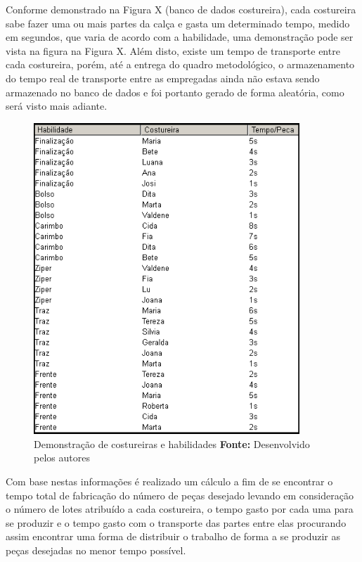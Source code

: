 \par Conforme demonstrado na Figura X (banco de dados costureira), cada costureira sabe fazer uma ou mais partes da calça e gasta um determinado tempo, medido em segundos, que varia de acordo com a habilidade, uma demonstração pode ser vista na figura na Figura X. Além disto, existe um tempo de transporte entre cada costureira, porém, até a entrega do quadro metodológico, o armazenamento do tempo
real de transporte entre as empregadas ainda não estava sendo armazenado no banco de dados e foi portanto gerado de forma aleatória, 
como será visto mais adiante.

\newpage

\begin{figure}[h!]
	\centerline{\includegraphics[width=10cm]{./imagens/tempo_habilidade2.png}}
	\caption[Costureiras e Habilidades]
	{Demonstração de costureiras e habilidades \textbf{Fonte:} Desenvolvido pelos autores}
	\label{fig:exemplo1}
\end{figure}

\par Com base nestas informações é realizado um cálculo a fim de se encontrar o tempo total de fabricação do número de peças
desejado levando em consideração o número de lotes atribuído a cada costureira, o tempo gasto por cada uma para se produzir e 
o tempo gasto com o transporte das partes entre elas procurando assim encontrar uma forma de distribuir o trabalho de forma a 
se produzir as peças desejadas no menor tempo possível. 



